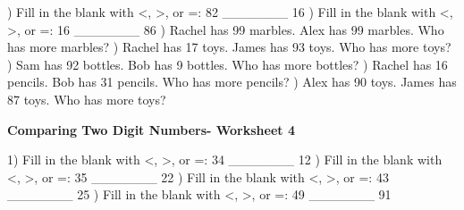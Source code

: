 \documentclass{article}%
\begin{document}
\newline%
) Fill in the blank with <, >, or =: 82 \_\_\_\_\_\_\_ 16%
\newline%
\newline%
) Fill in the blank with <, >, or =: 16 \_\_\_\_\_\_\_ 86%
\newline%
\newline%
) Rachel has 99 marbles. Alex has 99 marbles. Who has more marbles?%
\newline%
\newline%
) Rachel has 17 toys. James has 93 toys. Who has more toys?%
\newline%
\newline%
) Sam has 92 bottles. Bob has 9 bottles. Who has more bottles?%
\newline%
\newline%
) Rachel has 16 pencils. Bob has 31 pencils. Who has more pencils?%
\newline%
\newline%
) Alex has 90 toys. James has 87 toys. Who has more toys?%
\newline%
\newline%
\newline%
\pagebreak%
\large%
\begin{center}%
\textbf{Comparing Two Digit Numbers- Worksheet 4}%
\newline%
\end{center} \normalsize%
1) Fill in the blank with <, >, or =: 34 \_\_\_\_\_\_\_ 12%
\newline%
\newline%
) Fill in the blank with <, >, or =: 35 \_\_\_\_\_\_\_ 22%
\newline%
\newline%
) Fill in the blank with <, >, or =: 43 \_\_\_\_\_\_\_ 25%
\newline%
\newline%
) Fill in the blank with <, >, or =: 49 \_\_\_\_\_\_\_ 91%
\newline%
\newline%
\end{document}
